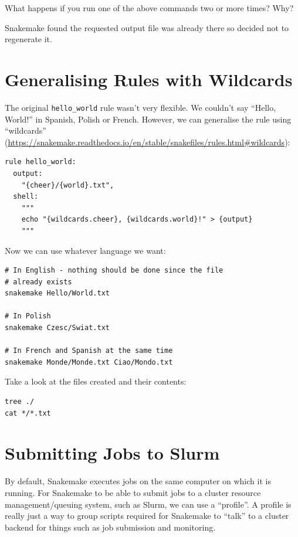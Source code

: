 \begin{questions}

What happens if you run one of the above commands two or more times? Why?

\begin{answer}
Snakemake found the requested output file was already there so decided not to regenerate it.
\end{answer}

\end{questions}


\section{Generalising Rules with Wildcards}

The original \texttt{hello\_world} rule wasn't very flexible.
We couldn't say ``Hello, World!'' in Spanish, Polish or French.
However, we can generalise the rule using ``wildcards'' (\url{https://snakemake.readthedocs.io/en/stable/snakefiles/rules.html#wildcards}):

\begin{lstlisting}
rule hello_world:
  output:
    "{cheer}/{world}.txt",
  shell:
    """
    echo "{wildcards.cheer}, {wildcards.world}!" > {output}
    """
\end{lstlisting}

Now we can use whatever language we want:

\begin{lstlisting}
# In English - nothing should be done since the file
# already exists
snakemake Hello/World.txt

# In Polish
snakemake Czesc/Swiat.txt

# In French and Spanish at the same time
snakemake Monde/Monde.txt Ciao/Mondo.txt
\end{lstlisting}

Take a look at the files created and their contents:

\begin{lstlisting}
tree ./
cat */*.txt
\end{lstlisting}

\section{Submitting Jobs to Slurm}

By default, Snakemake executes jobs on the same computer on which it is running.
For Snakemake to be able to submit jobs to a cluster resource management/queuing system, such as Slurm, we can use a ``profile''.
A profile is really just a way to group scripts required for Snakemake to ``talk'' to a cluster backend for things such as job submission and monitoring.


